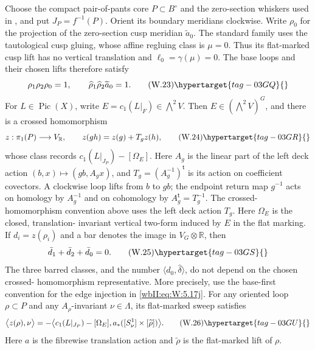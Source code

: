 \begin{lemma}
\hypertarget{tag-03IC}{}\label{wbII:lem:picard-crossed-defect}

Choose the compact pair-of-pants core $P\subset B^\circ$ and
the zero-section whiskers used in , and put
$J_P=f^{-1}(P)$.  Orient its boundary meridians clockwise.  Write
$\rho_0$ for the projection of the zero-section cusp meridian
$\widetilde a_0$.  The standard family uses the tautological cusp
gluing, whose affine regluing class is $\mu=0$.  Thus its flat-marked cusp lift
has no vertical translation and $\ell_0=\gamma(\mu)=0$.  The base loops and their chosen lifts therefore satisfy
\[
 \rho_1\rho_2\rho_0=1,
 \qquad
 \widehat\rho_1\widehat\rho_2\widetilde a_0=1.
\tag{W.23}\hypertarget{tag-03GQ}{}\label{wbII:eq:W:5.17g}
\]
For $L\in\operatorname{Pic}(X)$, write
$E=c_1(L|_F)\in\bigwedge^2V$.  Then $E\in(\bigwedge^2V)^G$, and there is a
crossed homomorphism
\[
 z:\pi_1(P)\longrightarrow V_{\mathbb R},\qquad
 z(gh)=z(g)+T_gz(h),
\tag{W.24}\hypertarget{tag-03GR}{}\label{wbII:eq:W:5.17h}
\]
whose class records
$c_1(L|_{J_P})-[\Omega_E]$.  Here $A_g$ is the linear part of the
left deck action $(b,x)\mapsto(gb,A_gx)$, and
$T_g=(A_g^{-1})^{\mathsf t}$ is its action on coefficient covectors.
A clockwise loop lifts from $b$ to $gb$; the endpoint return map $g^{-1}$
acts on homology by $A_g^{-1}$ and on cohomology by $A_g^{\mathsf t}=T_g^{-1}$.
The crossed-homomorphism convention above uses the left deck action $T_g$.  Here $\Omega_E$ is the closed, translation-
invariant vertical two-form induced by $E$ in the flat marking.  If
$d_i=z(\rho_i)$ and a bar denotes the image in
$V_G\otimes\mathbb R$, then
\[
 \bar d_1+\bar d_2+\bar d_0=0.
\tag{W.25}\hypertarget{tag-03GS}{}\label{wbII:eq:W:5.17i}
\]
The three barred classes, and the number
$\langle d_0,\widehat\delta\rangle$, do not depend on the chosen crossed-
homomorphism representative.  More precisely, use the base-first convention
for the edge injection in \eqref{wbII:eq:W:5.17j}.  For any oriented loop $\rho\subset P$
and any $A_\rho$-invariant $\nu\in\Lambda$, its flat-marked sweep satisfies
\[
 \bigl\langle z(\rho),\nu\bigr\rangle
 =-\bigl\langle c_1(L|_{J_P})-[\Omega_E],
 a_*([S^1_\nu]\times[\widetilde\rho])\bigr\rangle.
\tag{W.26}\hypertarget{tag-03GU}{}\label{wbII:eq:W:5.17j'}
\]
Here $a$ is the fibrewise translation action and $\widetilde\rho$ is the
flat-marked lift of $\rho$.
\end{lemma}



